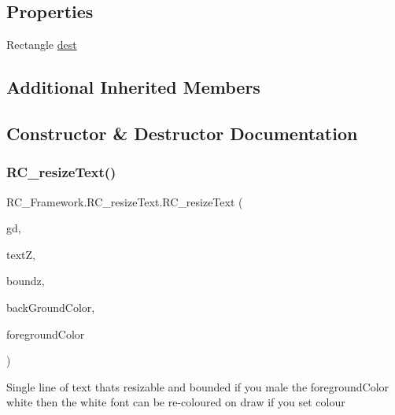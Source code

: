 \subsection*{Properties}
\begin{DoxyCompactItemize}
\item 
Rectangle \mbox{\hyperlink{class_r_c___framework_1_1_r_c__resize_text_a2fdff93da1c5820e14fdc49cb223d54f}{dest}}
\end{DoxyCompactItemize}
\subsection*{Additional Inherited Members}


\subsection{Constructor \& Destructor Documentation}
\mbox{\label{class_r_c___framework_1_1_r_c__resize_text_a177f87e9f41967dae29a97e27b3defd2}} 
\subsubsection{\texorpdfstring{R\+C\+\_\+resize\+Text()}{RC\_resizeText()}}
{\footnotesize\ttfamily R\+C\+\_\+\+Framework.\+R\+C\+\_\+resize\+Text.\+R\+C\+\_\+resize\+Text (\begin{DoxyParamCaption}\item[{Graphics\+Device}]{gd,  }\item[{string}]{textZ,  }\item[{Rectangle}]{boundz,  }\item[{Color}]{back\+Ground\+Color,  }\item[{Color}]{foreground\+Color }\end{DoxyParamCaption})}



Single line of text thats resizable and bounded if you male the foreground\+Color white then the white font can be re-\/coloured on draw if you set colour 


